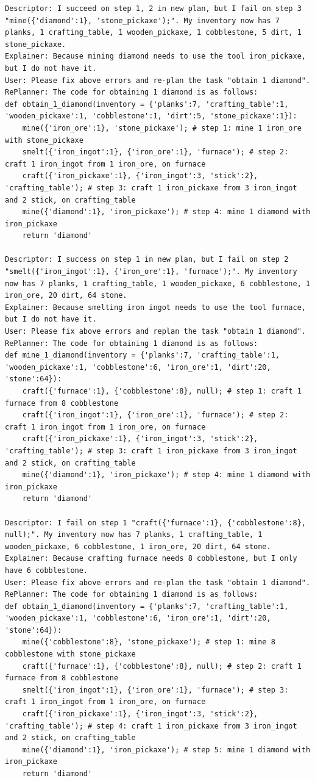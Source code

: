 \begin{lstlisting}
Descriptor: I succeed on step 1, 2 in new plan, but I fail on step 3 "mine({'diamond':1}, 'stone_pickaxe');". My inventory now has 7 planks, 1 crafting_table, 1 wooden_pickaxe, 1 cobblestone, 5 dirt, 1 stone_pickaxe.
Explainer: Because mining diamond needs to use the tool iron_pickaxe, but I do not have it.
User: Please fix above errors and re-plan the task "obtain 1 diamond".
RePlanner: The code for obtaining 1 diamond is as follows:
def obtain_1_diamond(inventory = {'planks':7, 'crafting_table':1, 'wooden_pickaxe':1, 'cobblestone':1, 'dirt':5, 'stone_pickaxe':1}):
    mine({'iron_ore':1}, 'stone_pickaxe'); # step 1: mine 1 iron_ore with stone_pickaxe
    smelt({'iron_ingot':1}, {'iron_ore':1}, 'furnace'); # step 2: craft 1 iron_ingot from 1 iron_ore, on furnace
    craft({'iron_pickaxe':1}, {'iron_ingot':3, 'stick':2}, 'crafting_table'); # step 3: craft 1 iron_pickaxe from 3 iron_ingot and 2 stick, on crafting_table
    mine({'diamond':1}, 'iron_pickaxe'); # step 4: mine 1 diamond with iron_pickaxe
    return 'diamond'

Descriptor: I success on step 1 in new plan, but I fail on step 2 "smelt({'iron_ingot':1}, {'iron_ore':1}, 'furnace');". My inventory now has 7 planks, 1 crafting_table, 1 wooden_pickaxe, 6 cobblestone, 1 iron_ore, 20 dirt, 64 stone.
Explainer: Because smelting iron ingot needs to use the tool furnace, but I do not have it.
User: Please fix above errors and replan the task "obtain 1 diamond".
RePlanner: The code for obtaining 1 diamond is as follows:
def mine_1_diamond(inventory = {'planks':7, 'crafting_table':1, 'wooden_pickaxe':1, 'cobblestone':6, 'iron_ore':1, 'dirt':20, 'stone':64}):
    craft({'furnace':1}, {'cobblestone':8}, null); # step 1: craft 1 furnace from 8 cobblestone 
    craft({'iron_ingot':1}, {'iron_ore':1}, 'furnace'); # step 2: craft 1 iron_ingot from 1 iron_ore, on furnace
    craft({'iron_pickaxe':1}, {'iron_ingot':3, 'stick':2}, 'crafting_table'); # step 3: craft 1 iron_pickaxe from 3 iron_ingot and 2 stick, on crafting_table
    mine({'diamond':1}, 'iron_pickaxe'); # step 4: mine 1 diamond with iron_pickaxe
    return 'diamond'

Descriptor: I fail on step 1 "craft({'furnace':1}, {'cobblestone':8}, null);". My inventory now has 7 planks, 1 crafting_table, 1 wooden_pickaxe, 6 cobblestone, 1 iron_ore, 20 dirt, 64 stone.
Explainer: Because crafting furnace needs 8 cobblestone, but I only have 6 cobblestone.
User: Please fix above errors and re-plan the task "obtain 1 diamond".
RePlanner: The code for obtaining 1 diamond is as follows:
def obtain_1_diamond(inventory = {'planks':7, 'crafting_table':1, 'wooden_pickaxe':1, 'cobblestone':6, 'iron_ore':1, 'dirt':20, 'stone':64}):
    mine({'cobblestone':8}, 'stone_pickaxe'); # step 1: mine 8 cobblestone with stone_pickaxe
    craft({'furnace':1}, {'cobblestone':8}, null); # step 2: craft 1 furnace from 8 cobblestone 
    smelt({'iron_ingot':1}, {'iron_ore':1}, 'furnace'); # step 3: craft 1 iron_ingot from 1 iron_ore, on furnace
    craft({'iron_pickaxe':1}, {'iron_ingot':3, 'stick':2}, 'crafting_table'); # step 4: craft 1 iron_pickaxe from 3 iron_ingot and 2 stick, on crafting_table
    mine({'diamond':1}, 'iron_pickaxe'); # step 5: mine 1 diamond with iron_pickaxe
    return 'diamond'


\end{lstlisting}
